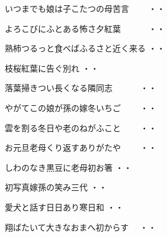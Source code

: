 \begin{shiika}いつまでも娘は子こたつの母苦言　　
\hfill{・・}\end{shiika}

\begin{shiika}よろこびにふとある怖さ夕紅葉　　　
\hfill{・・}\end{shiika}

\begin{shiika}熟柿つるっと食べばふるさと近く来る
\hfill{・・}\end{shiika}

\begin{shiika}枝桜紅葉に告ぐ別れ
\hfill{・・}\end{shiika}

\begin{shiika}落葉掃きつい長くなる隣同志　　　
\hfill{・・}\end{shiika}

\begin{shiika}やがてこの娘が孫の嫁冬いちご　　
\hfill{・・}\end{shiika}

\begin{shiika}雲を割る冬日や老のねがふこと　　
\hfill{・・}\end{shiika}

\begin{shiika}お元旦老母くり返すありがたや　　
\hfill{・・}\end{shiika}

\begin{shiika}しわのなき黒豆に老母初お箸
\hfill{・・}\end{shiika}

\begin{shiika}初写真嫁孫の笑み三代
\hfill{・・}\end{shiika}

\begin{shiika}愛犬と話す日日あり寒日和
\hfill{・・}\end{shiika}

\begin{shiika}翔ばたいて大きなおまへ初からす　
\hfill{・・}\end{shiika}

